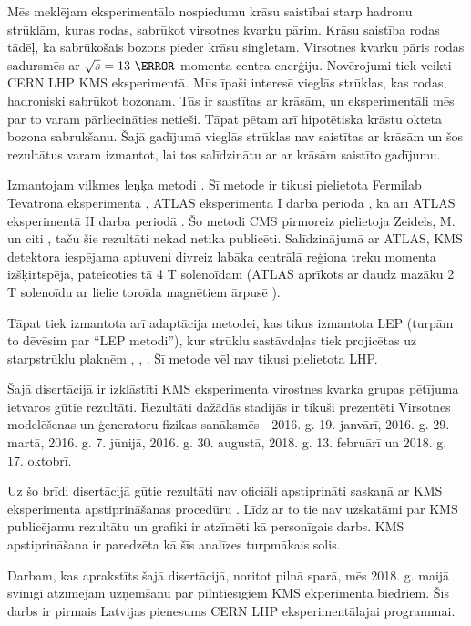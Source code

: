 Mēs meklējam eksperimentālo nospiedumu krāsu saistībai starp hadronu \gls{strūklām}, kuras rodas, sabrūkot \gls{virsotnes kvarku} pārim. Krāsu saistība rodas tādēļ, ka sabrūkošais \PW bozons pieder krāsu \gls{singletam}. Virsotnes kvarku pāris rodas \Pp\Pp sadursmēs ar $\sqrt{s}=13\ \TeV$ momenta centra enerģiju. Novērojumi tiek veikti CERN \gls{LHP} \gls{KMS} eksperimentā. Mūs īpaši interesē vieglās strūklas, kas rodas, hadroniski sabrūkot \PW bozonam. Tās ir saistītas ar krāsām, un eksperimentāli mēs par to varam pārliecināties netieši. Tāpat pētam arī hipotētiska krāstu okteta \PW bozona sabrukšanu. Šajā gadījumā vieglās strūklas nav saistītas ar krāsām un šos rezultātus varam izmantot, lai tos salīdzinātu ar ar krāsām saistīto gadījumu.  

Izmantojam vilkmes leņķa metodi \cite{Gallicchio:2010sw}. Šī metode ir tikusi pielietota Fermilab Tevatrona \DZERO eksperimentā \cite{Abazov:2011vh}, ATLAS eksperimentā I darba periodā \cite{Aad:2015lxa}, kā arī ATLAS eksperimentā II darba periodā \cite{Aaboud:2018ibj}. Šo metodi CMS pirmoreiz pielietoja Zeidels, M. un citi \cite{indico:Markus_cf}, taču šie rezultāti nekad netika publicēti. Salīdzinājumā ar ATLAS, KMS detektora iespējama aptuveni divreiz labāka centrālā reģiona treku momenta izšķirtspēja, pateicoties tā 4 T solenoīdam (ATLAS aprīkots ar daudz mazāku 2 T solenoīdu ar lielie toroīda magnētiem ārpusē \cite{Aad:2008zzm}).

Tāpat tiek izmantota arī adaptācija metodei, kas tikus izmantota LEP (turpām to dēvēsim par ``LEP metodi''), kur strūklu sastāvdaļas tiek projicētas uz starpstrūklu plaknēm \cite{Abbiendi:2005es}, \cite{Abdallah:2006uq}, \cite{Achard:2003pe}. Šī metode vēl nav tikusi pielietota LHP.

Šajā disertācijā ir izklāstīti KMS eksperimenta virostnes kvarka grupas pētījuma ietvaros gūtie rezultāti. Rezultāti dažādās stadijās ir tikuši prezentēti Virsotnes modelēšenas un ģeneratoru fizikas sanāksmēs - 2016. g. 19. janvārī, 2016. g. 29. martā, 2016. g. 7. jūnijā, 2016. g. 30. augustā, 2018. g. 13. februārī un 2018. g. 17. oktobrī.

Uz šo brīdi disertācijā gūtie rezultāti nav oficiāli apstiprināti saskaņā ar KMS eksperimenta apstiprināšanas procedūru \cite{twiki:PhysicsApprovals}. Līdz ar to tie nav uzskatāmi par KMS publicējamu rezultātu un grafiki ir atzīmēti kā personīgais darbs. KMS apstiprināšana ir paredzēta kā šīs analīzes turpmākais solis.

Darbam, kas aprakstīts šajā disertācijā, noritot pilnā sparā, mēs 2018. g. maijā svinīgi atzīmējām uzņemšanu par pilntiesīgiem KMS ekperimenta biedriem. Šis darbs ir pirmais Latvijas pienesums CERN LHP eksperimentālajai programmai.
